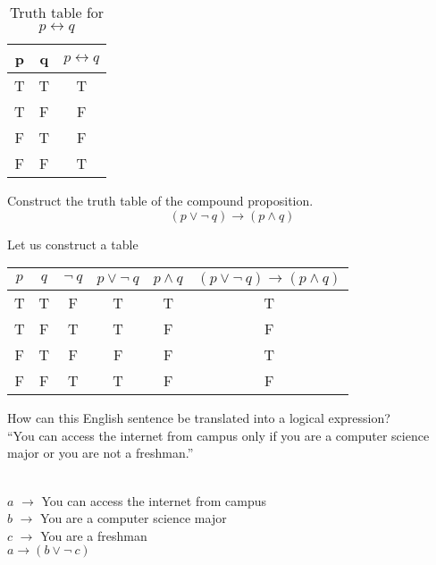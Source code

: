 \documentclass[../main-sheet.tex]{subfiles}
\begin{document}
\begin{table}[H]
    \centering
    \begin{tabular}{ccc}
        \toprule
        p & q & \(p\leftrightarrow q\) \\ \midrule
        T & T & T                      \\ 
        T & F & F                      \\ 
        F & T & F                      \\ 
        F & F & T                      \\ \bottomrule
    \end{tabular}
    \caption{Truth table for \(p\leftrightarrow q\)}
\end{table}
\begin{prob}
    Construct the truth table of the compound proposition.\[(p\vee \neg\ q)\to (p\wedge q)\]
\end{prob}
\begin{soln}
    Let us construct a table
    \begin{center}
        \begin{tabular}{cccccc}
            \toprule
            $ p $ & $ q $ & \(\neg\ q\) & \(p\vee \neg\ q\) & \(p \wedge q\) & \((p\vee \neg\ q)\to (p\wedge q)\) \\ \midrule
            T     & T     & F           & T                 & T              & T                                  \\ 
            T     & F     & T           & T                 & F              & F                                  \\ 
            F     & T     & F           & F                 & F              & T                                  \\ 
            F     & F     & T           & T                 & F              & F                                  \\ \bottomrule
        \end{tabular}
    \end{center}
\end{soln}
\begin{prob}
    How can this English sentence be translated into a logical expression?\\
    ``You can access the internet from campus only if you are a computer science major or you are not a freshman.''
\end{prob}
\begin{soln}
    \hfill\\
    \indent$ a $ \(\to\) You can access the internet from campus\\
    \indent$ b $ \(\to\) You are a computer science major\\
    \indent$ c $ \(\to\) You are a freshman\\
    \indent\(a\to(b\vee\neg\ c)\)
\end{soln}
\end{document}
